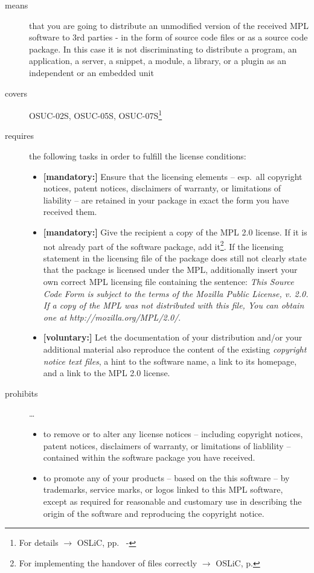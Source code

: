 \begin{description}

\item[means] that you are going to distribute an unmodified version of the
received MPL software to 3rd parties - in the form of source code files or as a
source code package. In this case it is not discriminating to distribute a
program, an application, a server, a snippet, a module, a library, or a plugin
as an independent or an embedded unit

\item[covers] OSUC-02S, OSUC-05S, OSUC-07S\footnote{For details $\rightarrow$
OSLiC, pp.\ \pageref{OSUC-02S-DEF} - \pageref{OSUC-07S-DEF}}

\item[requires] the following tasks in order to fulfill the license conditions:
\begin{itemize}
  
  \item \textbf{[mandatory:]} Ensure that the licensing elements -- esp.\ all
  copyright notices, patent notices, disclaimers of warranty, or limitations of
  liability -- are retained in your package in exact the form you have received
  them.

  \item \textbf{[mandatory:]} Give the recipient a copy of the MPL 2.0 license.
  If it is not already part of the software package, add it\footnote{For
  implementing the handover of files correctly $\rightarrow$ OSLiC, p.
  \pageref{DistributingFilesHint}}. If the licensing statement in the licensing
  file of the package does still not clearly state that the package is licensed
  under the MPL, additionally insert your own correct MPL licensing file
  containing the sentence: \emph{This Source Code Form is subject to the terms
  of the Mozilla Public License, v. 2.0. If a copy of the MPL was not
  distributed with this file, You can obtain one at
  http://mozilla.org/MPL/2.0/}.

  \item \textbf{[voluntary:]} Let the documentation of your distribution and/or
  your additional material also reproduce the content of the existing
  \emph{copyright notice text files}, a hint to the software name, a link to its
  homepage, and a link to the MPL 2.0 license.
\end{itemize}

\item[prohibits] \ldots
\begin{itemize}
  \item to remove or to alter any license notices -- including copyright
  notices, patent notices, disclaimers of warranty, or limitations of liablility
  -- contained within the software package you have received.
  \item to promote any of your products -- based on the this software -- by
  trademarks, service marks, or logos linked to this MPL software,  except as 
  required for reasonable and customary use in describing the origin
  of the software and reproducing the  copyright notice.
\end{itemize}
\end{description}


